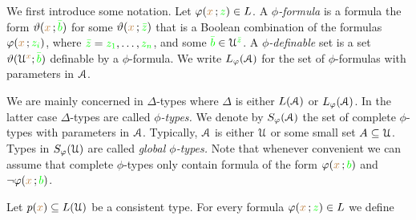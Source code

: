 We first introduce some notation.
Let $\varphi({\color{brown} x}\,;{\color{green} z})\in L$.
A \emph{$\phi$-formula\/} is a formula the form $\vartheta({\color{brown} x}\,;{\color{green}\bar b})$ for some $\vartheta({\color{brown} x}\,;{\color{green}\bar z})$ that is a Boolean combination of the formulas $\varphi({\color{brown} x}\,;{\color{green} z_i})$, where ${\color{green}\bar z}={\color{green} z_1},\dots,{\color{green} z_n}$, and some ${\color{green}\bar b}\in\EuScript U^{\color{green}\bar z}$.
A \emph{$\phi$-definable\/} set is a set  $\vartheta(\EuScript U^{\color{brown} x};{\color{green}\bar b})$ definable by a $\phi$-formula.
We write \emph{$L_\varphi(\EuScript A)$\/} for the set of $\phi$-formulas with parameters in $\EuScript A$.

We are mainly concerned in $\Delta$-types where $\Delta$ is either $L(\EuScript A)$ or $L_\varphi(\EuScript A)$.
In the latter case $\Delta$-types are called \emph{$\phi$-types.}
We denote by \emph{$S_\varphi(\EuScript A)$\/} the set of complete $\phi$-types with parameters in $\EuScript A$.
Typically, $\EuScript A$ is either $\EuScript U$ or some small set $A\subseteq\EuScript U$.
Types in \emph{$S_{\varphi}(\EuScript U)$\/} are called \emph{global $\phi$-types.}
Note that whenever convenient we can assume that complete $\phi$-types only contain formula of the form $\varphi({\color{brown} x}\,;{\color{green} b})$ and $\neg\varphi({\color{brown} x}\,;{\color{green} b})$.
   

% 

Let $p({\color{brown} x})\subseteq L(\EuScript U)$ be a consistent type.
For every formula $\varphi({\color{brown} x}\,;{\color{green} z})\in L$ we define



